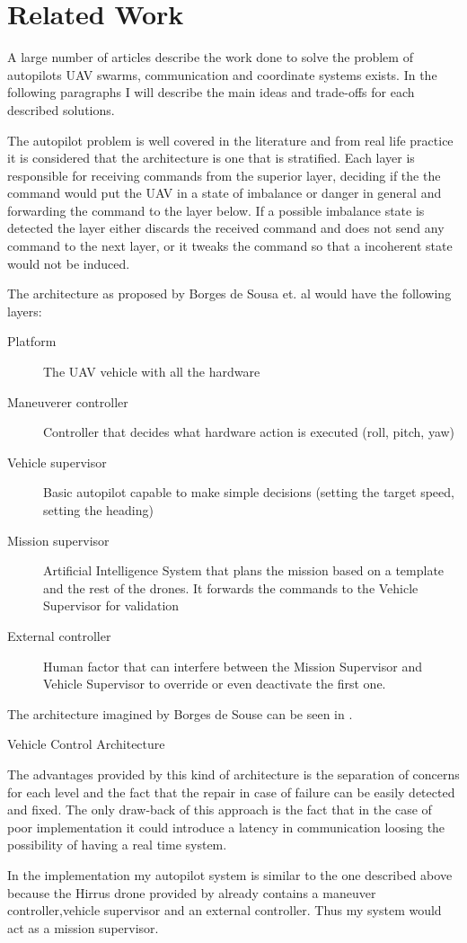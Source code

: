 \chapter{Related Work}
\label{chapter:related-work}

A large number of articles describe the work done to solve the problem of autopilots
UAV swarms, communication and coordinate systems exists. In the following paragraphs
I will describe the main ideas and trade-offs for each described solutions.

The autopilot problem is well covered in the literature and from real life practice
it is considered that the architecture is one that is stratified. Each layer
is responsible for receiving commands from the superior layer, deciding if the
the command would put the UAV in a state of imbalance or danger in general and
forwarding the command to the layer below. If a possible imbalance state is detected
the layer either discards the received command and does not send any command to 
the next layer,  or it tweaks the command so that a incoherent state would not
be induced.

The architecture as proposed by Borges de Sousa et. al \cite{pivant} would have
the following layers:

\begin{description}
\item[Platform] The UAV vehicle with all the hardware
\item[Maneuverer controller] Controller that decides what hardware action is 
executed (roll, pitch, yaw)
\item[Vehicle supervisor] Basic autopilot capable to make simple decisions 
(setting the target speed,  setting the heading)
\item[Mission supervisor] Artificial Intelligence System that plans the mission
based on a template and the rest of the drones. It forwards the commands to the
Vehicle Supervisor for validation
\item[External controller] Human factor that can interfere between the Mission
Supervisor and Vehicle Supervisor to override or even deactivate the first one.
\end{description}

The architecture imagined by Borges de Souse can be seen in .

{Vehicle Control Architecture}

\newpage
The advantages provided by this kind of architecture is the separation of
concerns for each level and the fact that the repair in case of failure can be
easily detected and fixed. The only draw-back of this approach is the fact
that in the case of poor implementation it could introduce a latency in communication
loosing the possibility of having a real time system.

In the implementation my autopilot system is similar to the one described above 
because the Hirrus drone \cite{hirrus} provided by  already contains
a maneuver controller,vehicle supervisor  and an external controller. Thus my
system would act as a mission supervisor.
